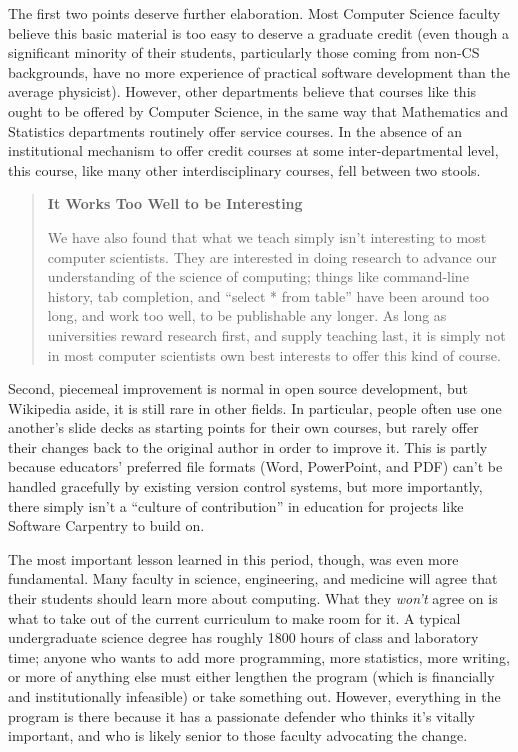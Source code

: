 \documentclass[10pt,a4paper,twocolumn]{article}
\begin{document}
The first two points deserve further elaboration. Most Computer Science
faculty believe this basic material is too easy to deserve a graduate
credit (even though a significant minority of their students,
particularly those coming from non-CS backgrounds, have no more
experience of practical software development than the average
physicist). However, other departments believe that courses like this
ought to be offered by Computer Science, in the same way that
Mathematics and Statistics departments routinely offer service courses.
In the absence of an institutional mechanism to offer credit courses at
some inter-departmental level, this course, like many other
interdisciplinary courses, fell between two stools.

\begin{quote}
\textbf{It Works Too Well to be Interesting}

We have also found that what we teach simply isn't interesting to most
computer scientists. They are interested in doing research to advance
our understanding of the science of computing; things like command-line
history, tab completion, and ``select * from table'' have been around
too long, and work too well, to be publishable any longer. As long as
universities reward research first, and supply teaching last, it is
simply not in most computer scientists own best interests to offer this
kind of course.
\end{quote}

Second, piecemeal improvement is normal in open source development, but
Wikipedia aside, it is still rare in other fields. In particular, people
often use one another's slide decks as starting points for their own
courses, but rarely offer their changes back to the original author in
order to improve it. This is partly because educators' preferred file
formats (Word, PowerPoint, and PDF) can't be handled gracefully by
existing version control systems, but more importantly, there simply
isn't a ``culture of contribution'' in education for projects like
Software Carpentry to build on.

The most important lesson learned in this period, though, was even more
fundamental. Many faculty in science, engineering, and medicine will
agree that their students should learn more about computing. What they
\emph{won't} agree on is what to take out of the current curriculum to
make room for it. A typical undergraduate science degree has roughly
1800 hours of class and laboratory time; anyone who wants to add more
programming, more statistics, more writing, or more of anything else
must either lengthen the program (which is financially and
institutionally infeasible) or take something out. However, everything
in the program is there because it has a passionate defender who thinks
it's vitally important, and who is likely senior to those faculty
advocating the change.
\end{document}

